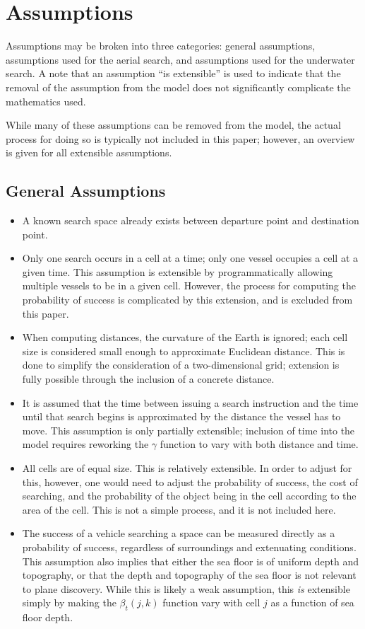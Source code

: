 \section{Assumptions}

Assumptions may be broken into three categories: general assumptions, assumptions used for the aerial search, and assumptions used for the underwater search. A note that an assumption ``is extensible'' is used to indicate that the removal of the assumption from the model does not significantly complicate the mathematics used.

While many of these assumptions can be removed from the model, the actual process for doing so is typically not included in this paper; however, an overview is given for all extensible assumptions.

\subsection{General Assumptions}

\begin{itemize}
\item A known search space already exists between departure point and destination point.
\item Only one search occurs in a cell at a time; only one vessel occupies a cell at a given time. This assumption is extensible by programmatically allowing multiple vessels to be in a given cell. However, the process for computing the probability of success is complicated by this extension, and is excluded from this paper.
\item When computing distances, the curvature of the Earth is ignored; each cell size is considered small enough to approximate Euclidean distance. This is done to simplify the consideration of a two-dimensional grid; extension is fully possible through the inclusion of a concrete distance.  
\item It is assumed that the time between issuing a search instruction and the time until that search begins is approximated by the distance the vessel has to move. This assumption is only partially extensible; inclusion of time into the model requires reworking the $\gamma$ function to vary with both distance and time.
\item All cells are of equal size. This is relatively extensible. In order to adjust for this, however, one would need to adjust the probability of success, the cost of searching, and the probability of the object being in the cell according to the area of the cell. This is not a simple process, and it is not included here.
\item The success of a vehicle searching a space can be measured directly as a probability of success, regardless of surroundings and extenuating conditions. This assumption also implies that either the sea floor is of uniform depth and topography, or that the depth and topography of the sea floor is not relevant to plane discovery. While this is likely a weak assumption, this \textit{is} extensible simply by making the $\beta_t(j,k)$ function vary with cell $j$ as a function of sea floor depth.
\end{itemize}

